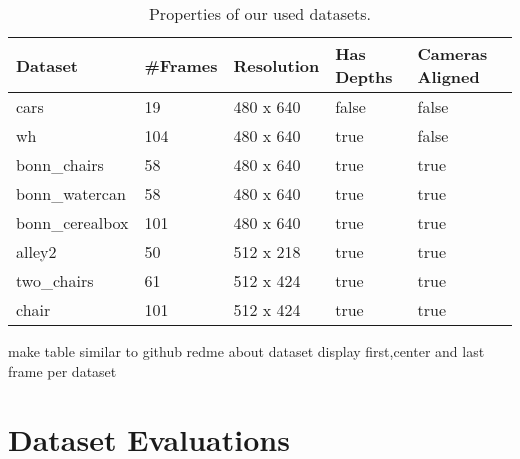 \begin{table}[H]
\centering
\begin{tabular}{|l|l|l|l|l|}
\hline
\textbf{Dataset} & \textbf{\#Frames} & \textbf{Resolution} & \textbf{Has Depths} & \textbf{Cameras Aligned} \\ \hline
cars & 19 & 480 x 640 & false & false \\ \hline
wh & 104 & 480 x 640 & true & false \\ \hline
bonn\_chairs & 58 & 480 x 640 & true & true \\ \hline
bonn\_watercan & 58 & 480 x 640 & true & true \\ \hline
bonn\_cerealbox & 101 & 480 x 640 & true & true \\ \hline
alley2 & 50 & 512 x 218 & true & true \\ \hline
two\_chairs & 61 & 512 x 424 & true & true \\ \hline
chair & 101 & 512 x 424 & true & true \\ \hline
\end{tabular}
\caption[Datasets]{Properties of our used datasets.}
\label{tab:datasets}
\end{table}


make table similar to github redme about dataset
display first,center and last frame per dataset





\section{Dataset Evaluations}



